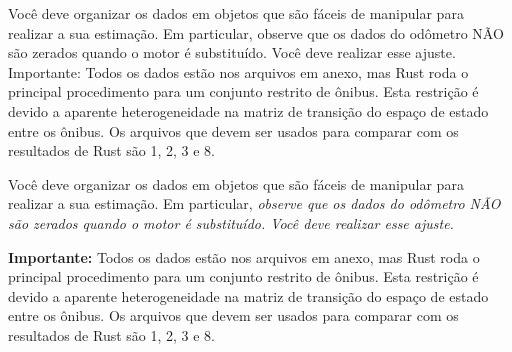 \documentclass[12pt,a4paper]{article}
\begin{document}
Você deve organizar os dados em objetos que são fáceis de manipular para
realizar a sua estimação. Em particular, observe que os dados do
odômetro NÃO são zerados quando o motor é substituído. Você deve
realizar esse ajuste. Importante: Todos os dados estão nos arquivos em
anexo, mas Rust roda o principal procedimento para um conjunto restrito
de ônibus. Esta restrição é devido a aparente heterogeneidade na matriz
de transição do espaço de estado entre os ônibus. Os arquivos que devem
ser usados para comparar com os resultados de Rust são 1, 2, 3 e 8.

Você deve organizar os dados em objetos que são fáceis de manipular para
realizar a sua estimação. Em particular, \emph{observe que os dados do
odômetro NÃO são zerados quando o motor é substituído. Você deve
realizar esse ajuste.}

\textbf{Importante:} Todos os dados estão nos arquivos em anexo, mas
Rust roda o principal procedimento para um conjunto restrito de ônibus.
Esta restrição é devido a aparente heterogeneidade na matriz de
transição do espaço de estado entre os ônibus. Os arquivos que devem ser
usados para comparar com os resultados de Rust são 1, 2, 3 e 8.
\end{document}
